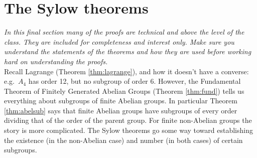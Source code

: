 \begin{exercises}{}{}
\begin{enumerate}
% 
	
\end{enumerate}
\end{exercises}

\clearpage

\iffalse

\section{The Sylow theorems}

\emph{In this final section many of the proofs are technical and above the level of the class. They are included for completeness and interest only. Make sure you understand the statements of the theorems and how they are used before working hard on understanding the proofs.}\\

Recall Lagrange (Theorem \ref{thm:lagrange}), and how it doesn't have a converse: e.g.~$A_4$ has order 12, but no subgroup of order 6. However, the Fundamental Theorem of Finitely Generated Abelian Groups (Theorem \ref{thm:fund}) tells us everything about subgroups of finite Abelian groups. In particular Theorem \ref{thm:abelsub} says that finite Abelian groups have subgroups of every order dividing that of the order of the parent group. For finite non-Abelian groups the story is more complicated. The Sylow theorems go some way toward establishing the existence (in the non-Abelian case) and number (in both cases) of certain subgroups.

